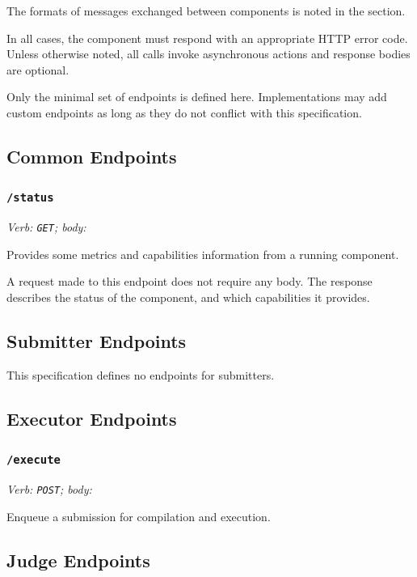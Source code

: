 \documentclass[11pt,letterpaper]{article}
\begin{document}
The formats of messages exchanged between components is noted in the
 section.

In all cases, the component must respond with an appropriate HTTP error code.
Unless otherwise noted, all calls invoke asynchronous actions and response
bodies are optional.

Only the minimal set of endpoints is defined here. Implementations may add
custom endpoints as long as they do not conflict with this specification.

\subsection{Common Endpoints}
\label{endpoints-common}

\subsubsection{\texttt{/status}}

\emph{Verb: \texttt{GET}; body: }

Provides some metrics and capabilities information from a running component.

A request made to this endpoint does not require any body. The response
describes the status of the component, and which capabilities it provides.

\subsection{Submitter Endpoints}
\label{endpoints-sub}

This specification defines no endpoints for submitters.

\subsection{Executor Endpoints}
\label{endpoints-exec}

\subsubsection{\texttt{/execute}}

\emph{Verb: \texttt{POST}; body: }

Enqueue a submission for compilation and execution.

\subsection{Judge Endpoints}
\label{endpoints-judge}
\end{document}
